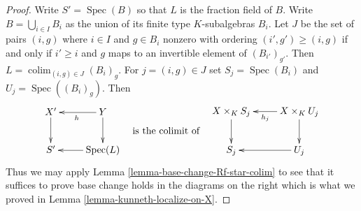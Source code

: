 \documentclass{amsart}
\theoremstyle{plain}
\theoremstyle{definition}
\theoremstyle{remark}
\numberwithin{equation}{subsection}
\def\colim{\mathop{\mathrm{colim}}\nolimits}
\def\Spec{\mathop{\mathrm{Spec}}}
\begin{document}
\begin{proof}
\medskip\noindent
Write $S' = \Spec(B)$ so that $L$ is the fraction field of $B$.
Write $B = \bigcup_{i \in I} B_i$ as the union of its finite type
$K$-subalgebras $B_i$. Let $J$ be the set of pairs $(i, g)$ where
$i \in I$ and $g \in B_i$ nonzero with ordering
$(i', g') \geq (i, g)$ if and only if $i' \geq i$ and
$g$ maps to an invertible element of $(B_{i'})_{g'}$.
Then $L = \colim_{(i, g) \in J} (B_i)_g$.
For $j = (i, g) \in J$ set $S_j = \Spec(B_i)$
and $U_j = \Spec((B_i)_g)$.
Then
$$
\vcenter{
\xymatrix{
X' \ar[d] & Y \ar[l]^h \ar[d] \\
S' & \Spec(L) \ar[l]
}
}
\quad\text{is the colimit of}\quad
\vcenter{
\xymatrix{
X \times_K S_j \ar[d] & X \times_K U_j \ar[l]^{h_j} \ar[d] \\
S_j & U_j \ar[l]
}
}
$$
Thus we may apply Lemma \ref{lemma-base-change-Rf-star-colim}
to see that it suffices to prove
base change holds in the diagrams on the right which is what we
proved in Lemma \ref{lemma-kunneth-localize-on-X}.
\end{proof}
\end{document}
